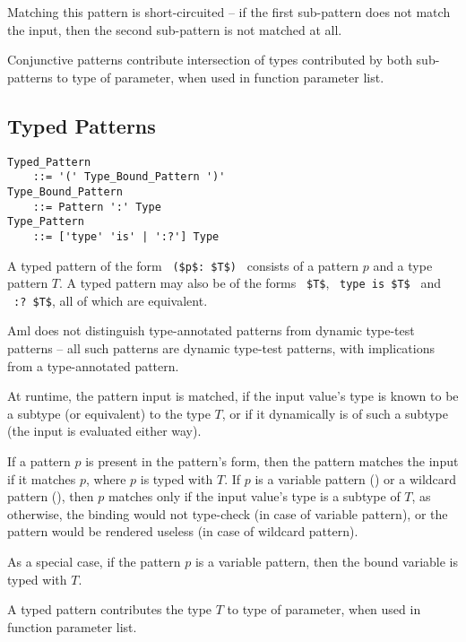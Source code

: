 Matching this pattern is short-circuited -- if the first sub-pattern does not match the input, then the second sub-pattern is not matched at all. 

Conjunctive patterns contribute intersection of types contributed by both sub-patterns to type of parameter, when used in function parameter list. 





\subsection{Typed Patterns}
\label{sec:typed-patterns}

\grammar\begin{lstlisting}
Typed_Pattern 
    ::= '(' Type_Bound_Pattern ')'
Type_Bound_Pattern 
    ::= Pattern ':' Type
Type_Pattern 
    ::= ['type' 'is' | ':?'] Type
\end{lstlisting}

A typed pattern of the form ~\lstinline!($p$: $T$)!~ consists of a pattern $p$ and a type pattern $T$. A typed pattern may also be of the forms ~\lstinline!$T$!, ~\lstinline!type is $T$!~ and
~\lstinline!:? $T$!, all of which are equivalent. 

Aml does not distinguish type-annotated patterns from dynamic type-test patterns -- all such patterns are dynamic type-test patterns, with implications from a type-annotated pattern. 

At runtime, the pattern input is matched, if the input value's type is known to be a subtype (or equivalent) to the type $T$, or if it dynamically is of such a subtype (the input is evaluated either way). 

If a pattern $p$ is present in the pattern's form, then the pattern matches the input if it matches $p$, where $p$ is typed with $T$. If $p$ is a variable pattern () or a wildcard pattern (), then $p$ matches only if the input value's type is a subtype of $T$, as otherwise, the binding would not type-check (in case of variable pattern), or the pattern would be rendered useless (in case of wildcard pattern). 

As a special case, if the pattern $p$ is a variable pattern, then the bound variable is typed with $T$. 

A typed pattern contributes the type $T$ to type of parameter, when used in function parameter list. 





